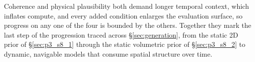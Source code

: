 Coherence and physical plausibility both demand longer temporal context, which inflates compute, and every added condition enlarges the evaluation surface, so progress on any one of the four is bounded by the others. Together they mark the last step of the progression traced across §\ref{sec:generation}, from the static 2D prior of §\ref{sec:p3_s8_1} through the static volumetric prior of §\ref{sec:p3_s8_2} to dynamic, navigable models that consume spatial structure over time.
